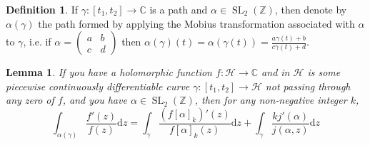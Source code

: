 \documentclass{article}
\newtheorem{lemma}[theorem]{Lemma}
\theoremstyle{definition}
\newtheorem{definition}{Definition}[section]
\theoremstyle{definition}
\theoremstyle{definition}
\newcommand{\SLZ}{\operatorname{SL}_2(\mathbb{Z})}
\newcommand{\Mabcd}{\begin{pmatrix} a&b\\c&d \end{pmatrix}}
\begin{document}
\begin{definition}
    If $\gamma:[t_1,t_2]\rightarrow\mathbb C$ is a path and $\alpha\in\SLZ$, then denote by $\alpha(\gamma)$ the path formed by applying the Mobius transformation associated with $\alpha$ to $\gamma$, i.e. if $\alpha=\Mabcd$ then $\alpha(\gamma)(t)=\alpha(\gamma(t))=\frac{a\gamma(t)+b}{c\gamma(t)+d}$.
\end{definition}

\begin{lemma}\label{alphaarg}
If you have a holomorphic function $f : \mathcal{H} \rightarrow \mathbb{C}$ and in $\mathcal{H}$ is some piecewise continuously differentiable curve $\gamma : [t_1, t_2] \rightarrow \mathcal{H}$ not passing through any zero of $f$, and you have $\alpha \in \SLZ$, then for any non-negative integer $k$,
$$\int_{\alpha (\gamma)} \frac{f' (z)}{f (z)} \mathrm{d} z=\int_{\gamma} \frac{(f [\alpha]_k)' (z)}{f [\alpha]_k (z)} \mathrm{d} z + \int_{\gamma} \frac{kj' (\alpha)}{j (\alpha, z)} \mathrm{d} z$$
\end{lemma}
\end{document}
